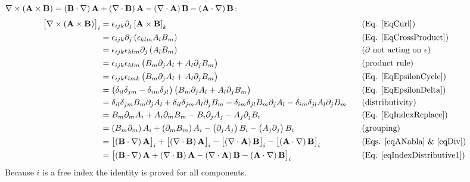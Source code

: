  
$\nabla\times\left(\mathbf{ A}\times\mathbf{ B}\right)=\left(\mathbf{ B}
\cdot\nabla\right)\mathbf{ A}+\left(\nabla\cdot\mathbf{ B}\right)\mathbf{ A}
-\left(\nabla\cdot\mathbf{ A}\right)\mathbf{ B}-\left(\mathbf{ A}
\cdot\nabla\right)\mathbf{ B}$:
\begin{equation}
\begin{aligned}\hspace{-0.5cm}\left[\nabla\times\left(\vector{A}\times\vector{B}
\right)\right]_{i} & 
=\epsilon_{ijk}\partial_{j}\left[\vector{A}\times\vector{B}\right]_{k} & 
\,\,\,\,\, & \text{(Eq. \ref{EqCurl})}\\
 & =\epsilon_{ijk}\partial_{j}\left(\epsilon_{klm}A_{l}B_{m}\right) &  & 
\text{(Eq. \ref{EqCrossProduct})}\\
 & =\epsilon_{ijk}\epsilon_{klm}\partial_{j}\left(A_{l}B_{m}\right) &  & 
\text{(\ensuremath{\partial}\ not acting on \ensuremath{\epsilon})}\\
 & 
=\epsilon_{ijk}\epsilon_{klm}\left(B_{m}\partial_{j}A_{l}+A_{l}\partial_{j}B_{m}
\right) &  & \text{(product rule)}\\
 & 
=\epsilon_{ijk}\epsilon_{lmk}\left(B_{m}\partial_{j}A_{l}+A_{l}\partial_{j}B_{m}
\right) &  & \text{(Eq. \ref{EqEpsilonCycle})}\\
 & 
=\left(\delta_{il}\delta_{jm}-\delta_{im}\delta_{jl}\right)\left(B_{m}\partial_{
j}A_{l}+A_{l}\partial_{j}B_{m}\right) &  & \text{(Eq. \ref{EqEpsilonDelta})}\\
 & 
=\delta_{il}\delta_{jm}B_{m}\partial_{j}A_{l}+\delta_{il}\delta_{jm}A_{l}
\partial_{j}B_{m}-\delta_{im}\delta_{jl}B_{m}\partial_{j}A_{l}-\delta_{im}
\delta_{jl}A_{l}\partial_{j}B_{m} &  & \text{(distributivity)}\\
 & 
=B_{m}\partial_{m}A_{i}+A_{i}\partial_{m}B_{m}-B_{i}\partial_{j}A_{j}-A_{j}
\partial_{j}B_{i} &  & \text{(Eq. \ref{EqIndexReplace})}\\
 & 
=\left(B_{m}\partial_{m}\right)A_{i}+\left(\partial_{m}B_{m}\right)A_{i}
-\left(\partial_{j}A_{j}\right)B_{i}-\left(A_{j}\partial_{j}\right)B_{i} &  & 
\text{(grouping)}\\
 & 
=\left[\left(\vector{B}\cdot\nabla\right)\vector{A}\right]_{i}+\left[
\left(\nabla\cdot\vector{B}\right)\vector{A}\right]_{i}-\left[
\left(\nabla\cdot\vector{A}\right)\vector{B}\right]_{i}-\left[\left(\vector{A}
\cdot\nabla\right)\vector{B}\right]_{i} &  & \text{(Eqs. \ref{eqANabla} \& 
\ref{eqDiv})}\\
 & 
=\left[\left(\vector{B}\cdot\nabla\right)\vector{A}+\left(\nabla\cdot\vector{B}
\right)\vector{A}-\left(\nabla\cdot\vector{A}\right)\vector{B}-\left(\vector{A}
\cdot\nabla\right)\vector{B}\right]_{i} &  & \text{(Eq. 
\ref{eqIndexDistributive1})}
\end{aligned}
\end{equation}
Because $i$ is a free index the identity is proved for all components.

